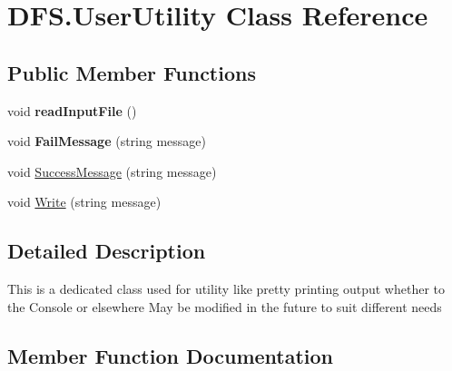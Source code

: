 \hypertarget{class_d_f_s_1_1_user_utility}{}\section{D\+F\+S.\+User\+Utility Class Reference}
\label{class_d_f_s_1_1_user_utility}
\subsection*{Public Member Functions}
\begin{DoxyCompactItemize}
\item 
\hypertarget{class_d_f_s_1_1_user_utility_a0b3e68bc725345888a7ac84c355a1d7f}{}void {\bfseries read\+Input\+File} ()\label{class_d_f_s_1_1_user_utility_a0b3e68bc725345888a7ac84c355a1d7f}

\item 
\hypertarget{class_d_f_s_1_1_user_utility_a2bac0f0c682da7919e23243250ced949}{}void {\bfseries Fail\+Message} (string message)\label{class_d_f_s_1_1_user_utility_a2bac0f0c682da7919e23243250ced949}

\item 
void \hyperlink{class_d_f_s_1_1_user_utility_acdaae45518fcba5d31fb4a704279a4bd}{Success\+Message} (string message)
\item 
void \hyperlink{class_d_f_s_1_1_user_utility_a48d1ed7bdc35ad0767ed80a81ce66cc9}{Write} (string message)
\end{DoxyCompactItemize}


\subsection{Detailed Description}
This is a dedicated class used for utility like pretty printing output whether to the Console or elsewhere May be modified in the future to suit different needs 

\subsection{Member Function Documentation}
\hypertarget{class_d_f_s_1_1_user_utility_acdaae45518fcba5d31fb4a704279a4bd}{}
